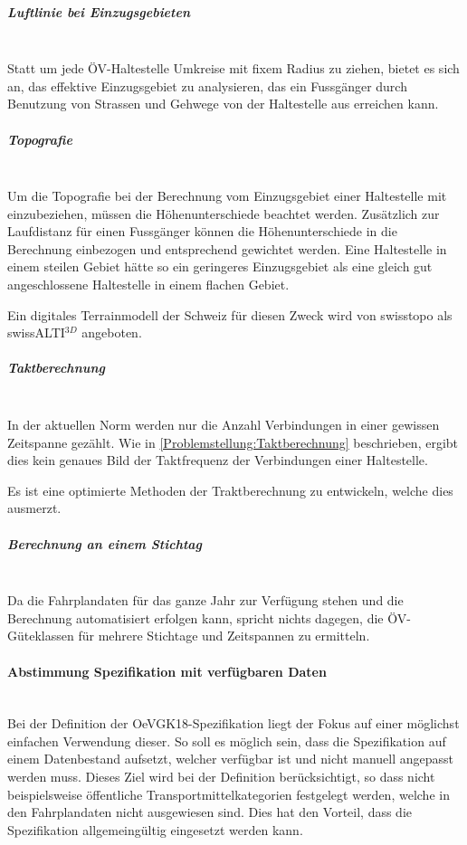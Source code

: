 \subparagraph{Luftlinie bei Einzugsgebieten}~\\
\label{Evaluierung grundlegender Verbesserungen:Luftlinie bei Einzugsgebieten}
Statt um jede \acs{ÖV}-Haltestelle Umkreise mit fixem Radius zu ziehen, bietet es sich an, das effektive Einzugsgebiet zu analysieren, das ein Fussgänger durch Benutzung von Strassen und Gehwege von der Haltestelle aus erreichen kann.

\subparagraph{Topografie}~\\
\label{Evaluierung grundlegender Verbesserungen:Topografie}
Um die Topografie bei der Berechnung vom Einzugsgebiet einer Haltestelle mit einzubeziehen, müssen die Höhenunterschiede beachtet werden.
Zusätzlich zur Laufdistanz für einen Fussgänger können die Höhenunterschiede in die Berechnung einbezogen und entsprechend gewichtet werden.
Eine Haltestelle in einem steilen Gebiet hätte so ein geringeres Einzugsgebiet als eine gleich gut angeschlossene Haltestelle in einem flachen Gebiet.

Ein digitales \gls{Terrainmodell} der Schweiz für diesen Zweck wird von swisstopo als swissALTI$^{3D}$ angeboten.~\cite{swissalti3d_swisstopo}

\subparagraph{Taktberechnung}~\\
\label{Evaluierung grundlegender Verbesserungen:Taktberechnung}
In der aktuellen Norm werden nur die Anzahl Verbindungen in einer gewissen Zeitspanne gezählt.
Wie in \ref{Problemstellung:Taktberechnung} beschrieben, ergibt dies kein genaues Bild der Taktfrequenz der Verbindungen einer Haltestelle.

Es ist eine optimierte Methoden der Traktberechnung zu entwickeln, welche dies ausmerzt.

\subparagraph{Berechnung an einem Stichtag}~\\
\label{Evaluierung grundlegender Verbesserungen:Berechnung an einem Stichtag}
Da die Fahrplandaten für das ganze Jahr zur Verfügung stehen und die Berechnung automatisiert erfolgen kann, spricht nichts dagegen, die \acs{ÖV}-Güteklassen für mehrere Stichtage und Zeitspannen zu ermitteln.

\paragraph{Abstimmung Spezifikation mit verfügbaren Daten}~\\
\label{Spezifikation OeVGK18:Abstimmung Spezifikation mit verfügbaren Daten}
Bei der Definition der \gls{OeVGK18}-Spezifikation liegt der Fokus auf einer möglichst einfachen Verwendung dieser. 
So soll es möglich sein, dass die Spezifikation auf einem Datenbestand aufsetzt, welcher verfügbar ist und nicht manuell angepasst werden muss.
Dieses Ziel wird bei der Definition berücksichtigt, so dass nicht beispielsweise öffentliche Transportmittelkategorien festgelegt werden, welche in den Fahrplandaten nicht ausgewiesen sind.
Dies hat den Vorteil, dass die Spezifikation allgemeingültig eingesetzt werden kann.

